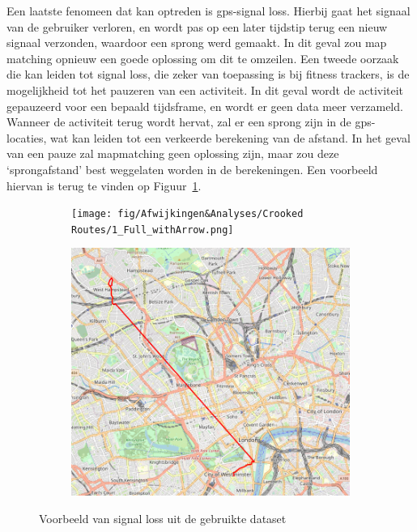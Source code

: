 Een laatste fenomeen dat kan optreden is \ac{gps}-signal loss. Hierbij gaat het
signaal van de gebruiker verloren, en wordt pas op een later tijdstip terug een
nieuw signaal verzonden, waardoor een sprong werd gemaakt. In dit geval zou map
matching opnieuw een goede oplossing om dit te omzeilen. Een tweede oorzaak die
kan leiden tot signal loss, die zeker van toepassing is bij fitness trackers,
is de mogelijkheid tot het pauzeren van een activiteit. In dit geval wordt de
activiteit gepauzeerd voor een bepaald tijdsframe, en wordt er geen data meer
verzameld. Wanneer de activiteit terug wordt hervat, zal er een sprong zijn in
de \ac{gps}-locaties, wat kan leiden tot een verkeerde berekening van de
afstand. In het geval van een pauze zal mapmatching geen oplossing zijn, maar
zou deze `sprongafstand' best weggelaten worden in de berekeningen. Een
voorbeeld hiervan is terug te vinden op Figuur~\ref{fig:gps_signal_loss}.
\begin{figure}
    \begin{subfigure}[b]{0.49\textwidth}
        \centering
        \texttt{[image: fig/Afwijkingen\&Analyses/Crooked Routes/1\_Full\_withArrow.png]}
    \end{subfigure}
    \begin{subfigure}[b]{0.49\textwidth}
        \centering
        \includegraphics[width=\textwidth]{fig/Afwijkingen&Analyses/Crooked Routes/1_Full_original.png}
    \end{subfigure}
    \caption{Voorbeeld van signal loss uit de gebruikte dataset}\label{fig:gps_signal_loss}
\end{figure}

